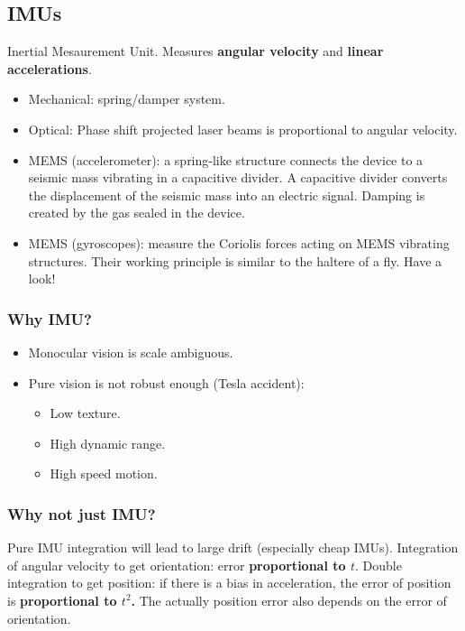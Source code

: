 \documentclass[a4paper,12 pt]{article}
\theoremstyle{definition}
\theoremstyle{remark}
\theoremstyle{definition}
\theoremstyle{definition}
\theoremstyle{definition}
\theoremstyle{remark}
\theoremstyle{definition}
\begin{document}
\subsection*{IMUs}
Inertial Mesaurement Unit. Measures \textbf{angular velocity} and \textbf{linear accelerations}. 
\begin{itemize}
\item Mechanical: spring/damper system.
\item Optical: Phase shift projected laser beams is proportional to angular velocity.
\item MEMS (accelerometer): a spring-like structure connects the device to a seismic mass vibrating in a capacitive divider. A capacitive divider converts the displacement of the seismic mass into an electric signal. Damping is created by the gas sealed in the device.
\item MEMS (gyroscopes): measure the Coriolis forces acting on MEMS vibrating structures. Their working principle is similar to the haltere of a fly. Have a look!
\end{itemize}
\subsubsection*{Why IMU?}
\begin{itemize}
\item Monocular vision is scale ambiguous.
\item Pure vision is not robust enough (Tesla accident):
\begin{itemize}
\item Low texture.
\item High dynamic range.
\item High speed motion.
\end{itemize}
\end{itemize}
\subsubsection*{Why not just IMU?}
Pure IMU integration will lead to large drift (especially cheap IMUs). Integration of angular velocity to get orientation: error \textbf{proportional to $t$}. Double integration to get position: if there is a bias in acceleration, the error of position is \textbf{proportional to $t^2$.} The actually position error also depends on the error of orientation.
\end{document}
